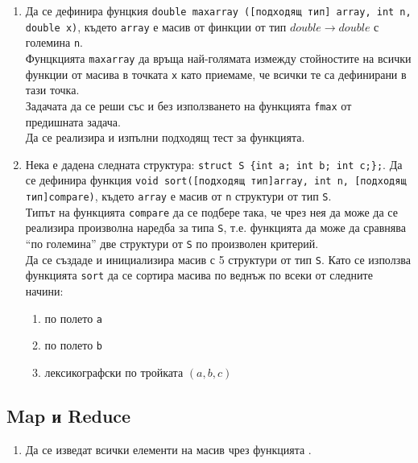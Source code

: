 {\begin{enumerate}[resume]
	Да се реализира и изпълни подходящ тест за функцията.

	\item Да се дефинира фунцкия \texttt{double maxarray ([подходящ тип] array, int n, double x)}, където \texttt{array} е масив от финкции от тип $double \rightarrow double$ с големина \texttt{n}. \\

	Фунцкцията \texttt{maxarray} да връща най-голямата измежду стойностите на всички функции от масива в точката \texttt{x} като приемаме, че всички те са дефинирани в тази точка.\\

	Задачата да се реши със и без използването на функцията \texttt{fmax} от предишната задача.\\

	Да се реализира и изпълни подходящ тест за функцията.

	\item Нека е дадена следната структура: \texttt{struct S \{int a; int b; int c;\};}. Да се дефинира функция \texttt{void sort([подходящ тип]array, int n, [подходящ тип]compare)}, където \texttt{array} е масив от \texttt{n} структури от тип \texttt{S}.\\

	Типът на функцията \texttt{compare} да се подбере така, че чрез нея да може да се реализира произволна наредба за типа \texttt{S}, т.е. функцията да може да сравнява ``по големина'' две структури от \texttt{S} по произволен критерий.\\

	Да се създаде и инициализира масив с 5 структури от тип \texttt{S}. Като се използва функцията \texttt{sort} да се сортира масива по веднъж по всеки от следните начини:

	\begin{enumerate}[label=\alph*)]
		\item по полето \texttt{a}
		\item по полето \texttt{b}
		\item лексикографски по тройката $(a,b,c)$
  \end{enumerate}
\end{enumerate}

  \pagebreak
  \subsection {Map и Reduce}

\begin{enumerate}[resume]  
  \item Да се изведат всички елементи на масив чрез функцията .
  

\end{enumerate}}

